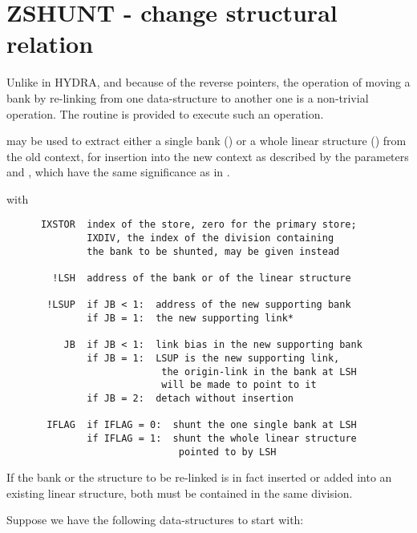 \section{ZSHUNT - change structural relation}

Unlike in HYDRA, and because of the reverse pointers,
the operation of moving a bank by re-linking from one data-structure
to another one is a non-trivial operation.
The routine  is provided to execute such an operation.

 may be used to extract either a single bank ()
or a whole linear structure () from the old context,
for insertion into the new context as described by the parameters
 and , which have the same significance as in .


with
\begin{verbatim}
      IXSTOR  index of the store, zero for the primary store;
              IXDIV, the index of the division containing
              the bank to be shunted, may be given instead

        !LSH  address of the bank or of the linear structure

       !LSUP  if JB < 1:  address of the new supporting bank
              if JB = 1:  the new supporting link*

          JB  if JB < 1:  link bias in the new supporting bank
              if JB = 1:  LSUP is the new supporting link,
                           the origin-link in the bank at LSH
                           will be made to point to it
              if JB = 2:  detach without insertion

       IFLAG  if IFLAG = 0:  shunt the one single bank at LSH
              if IFLAG = 1:  shunt the whole linear structure
                              pointed to by LSH
\end{verbatim} 
If the bank or the structure to be re-linked is in fact inserted
or added into an existing linear structure,
both must be contained in the same division.

\Examples

Suppose we have the following data-structures to start with:

